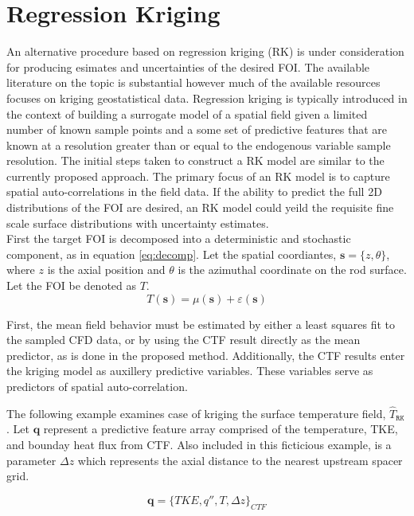 \section{Regression Kriging}

An alternative procedure based on regression kriging (RK) is under consideration for producing esimates and uncertainties of the desired FOI.
The available literature on the topic is substantial however much of the available resources focuses on kriging geostatistical data.  Regression kriging is typically introduced in the context of building
a surrogate model of a spatial field given a limited number of known sample points and a some set of predictive features that are known at a resolution greater than or equal to the endogenous variable sample resolution.
The initial steps taken to construct a RK model are similar to the currently proposed approach.  The primary focus of an RK model is to capture spatial auto-correlations in the field data.   If the ability to predict the full 2D distributions of the FOI are desired, an RK model could yeild the requisite fine scale surface distributions with uncertainty estimates. \\

First the target FOI is decomposed into a deterministic and stochastic component, as in equation \ref{eq:decomp}.
Let the spatial coordiantes, $\mathbf{s} = \{z, \theta\}$,
where $z$ is the axial position and $\theta$ is the azimuthal coordinate on the rod surface. Let the FOI be denoted as $T$.
\begin{equation}
T(\mathbf s) = \mu(\mathbf s) + \varepsilon(\mathbf s)
\label{eq:decomp}
\end{equation}

First, the mean field behavior must be estimated by either a least squares fit to the sampled CFD data, or by using the CTF result directly as the mean predictor, as is done in the proposed method. 
Additionally, the CTF results enter the kriging model as auxillery predictive variables.  These variables serve as predictors of spatial auto-correlation.

The following example examines case of kriging the surface temperature field, $\hat T_\mathtt{RK}$.
Let $\mathbf{q}$ represent a predictive feature array comprised of the temperature,
TKE, and bounday heat flux from CTF.  Also included in this ficticious example, is a parameter $\Delta z$ which represents the axial distance to the nearest upstream spacer grid.

\begin{equation}
\mathbf{q} = \{TKE, q'', T, \Delta z \}_{CTF}
\end{equation}

